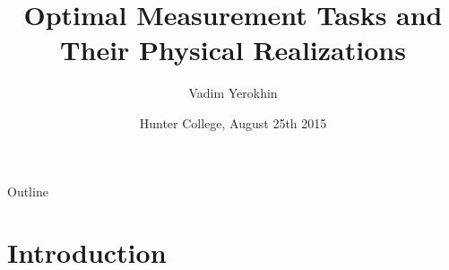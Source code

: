 \documentclass{beamer}
\title
{Optimal Measurement Tasks and Their Physical Realizations}
\author[Vadim Yerokhin] %
{Vadim Yerokhin }
\date[CFP 2003] %
{Hunter College, August 25th 2015 }
\begin{document}
\begin{frame}
  \titlepage
\end{frame}

\begin{frame}{Outline}
  \tableofcontents[pausesections]
\end{frame}





\section{Introduction}
\end{document}
